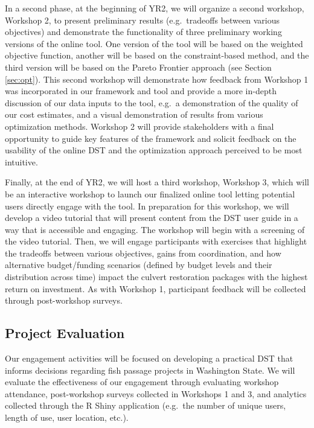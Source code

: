 \documentclass[12pt]{elsarticle}
\begin{document}
In a second phase, at the beginning of YR2, we will organize a second workshop, Workshop 2, to present preliminary results (e.g.\ tradeoffs between various objectives) and demonstrate the functionality of three preliminary working versions of the online tool. One version of the tool will be based on the weighted objective function, another will be based on the constraint-based method, and the third version will be based on the Pareto Frontier approach (see Section \ref{sec:opt}). This second workshop will demonstrate how feedback from Workshop 1 was incorporated in our framework and tool and provide a more in-depth discussion of our data inputs to the tool, e.g.\ a demonstration of the quality of our cost estimates, and a visual demonstration of results from various optimization methods. Workshop 2 will provide stakeholders with a final opportunity to guide key features of the framework and solicit feedback on the usability of the online DST and the optimization approach perceived to be most intuitive. 

Finally, at the end of YR2, we will host a third workshop, Workshop 3, which will be an interactive workshop to launch our finalized online tool letting potential users directly engage with the tool. In preparation for this workshop, we will develop a video tutorial that will present content from the DST user guide in a way that is accessible and engaging. The workshop will begin with a screening of the video tutorial. Then, we will engage participants with exercises that highlight the tradeoffs between various objectives, gains from coordination, and how alternative budget/funding scenarios (defined by budget levels and their distribution across time) impact the culvert restoration packages with the highest return on investment. As with Workshop 1, participant feedback will be collected through post-workshop surveys.


\subsection*{Project Evaluation}

Our engagement activities will be focused on developing a practical DST that informs decisions regarding fish passage projects in Washington State. We will evaluate the effectiveness of our engagement through evaluating workshop attendance, post-workshop surveys collected in Workshops 1 and 3, and analytics collected through the R Shiny application (e.g.\ the number of unique users, length of use, user location, etc.).
\end{document}
